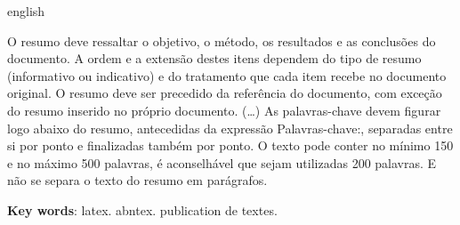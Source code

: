 

\begin{resumo}[Abstract]
\begin{otherlanguage*}{english}

O resumo deve ressaltar o objetivo, o método, os resultados e as conclusões do documento. A ordem e a extensão destes itens dependem do tipo de resumo (informativo ou indicativo) e do tratamento que cada item recebe no documento original. O resumo deve ser precedido da referência do documento, com exceção do resumo inserido no próprio documento. (\ldots) As palavras-chave devem figurar logo abaixo do resumo, antecedidas da expressão Palavras-chave:, separadas entre si por ponto e finalizadas também por ponto. O texto pode conter no mínimo 150 e no máximo 500 palavras, é aconselhável que sejam utilizadas 200 palavras. E não se separa o texto do resumo em parágrafos.


\vspace{\onelineskip}
\noindent
\textbf{Key words}: latex. abntex. publication de textes.
\end{otherlanguage*}
\end{resumo}
